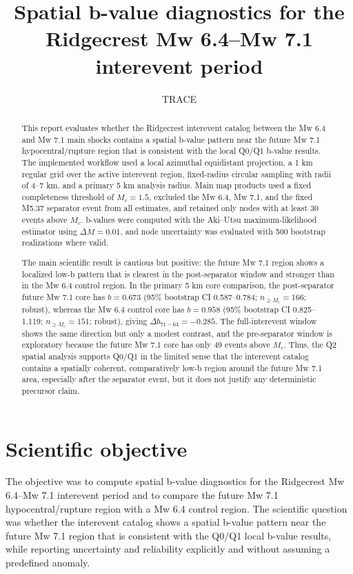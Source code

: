 \documentclass[11pt]{article}
\title{Spatial b-value diagnostics for the Ridgecrest Mw 6.4--Mw 7.1 interevent period}
\author{TRACE}
\date{}
\begin{document}
\maketitle

\begin{abstract}
This report evaluates whether the Ridgecrest interevent catalog between the Mw 6.4 and Mw 7.1 main shocks contains a spatial b-value pattern near the future Mw 7.1 hypocentral/rupture region that is consistent with the local Q0/Q1 b-value results. The implemented workflow used a local azimuthal equidistant projection, a 1 km regular grid over the active interevent region, fixed-radius circular sampling with radii of 4--7 km, and a primary 5 km analysis radius. Main map products used a fixed completeness threshold of $M_c=1.5$, excluded the Mw 6.4, Mw 7.1, and the fixed M5.37 separator event from all estimates, and retained only nodes with at least 30 events above $M_c$. b-values were computed with the Aki--Utsu maximum-likelihood estimator using $\Delta M=0.01$, and node uncertainty was evaluated with 500 bootstrap realizations where valid.

The main scientific result is cautious but positive: the future Mw 7.1 region shows a localized low-b pattern that is clearest in the post-separator window and stronger than in the Mw 6.4 control region. In the primary 5 km core comparison, the post-separator future Mw 7.1 core has $b=0.673$ (95\% bootstrap CI 0.587--0.784; $n_{\ge M_c}=166$; robust), whereas the Mw 6.4 control core has $b=0.958$ (95\% bootstrap CI 0.825--1.119; $n_{\ge M_c}=151$; robust), giving $\Delta b_{71-64}=-0.285$. The full-interevent window shows the same direction but only a modest contrast, and the pre-separator window is exploratory because the future Mw 7.1 core has only 49 events above $M_c$. Thus, the Q2 spatial analysis supports Q0/Q1 in the limited sense that the interevent catalog contains a spatially coherent, comparatively low-b region around the future Mw 7.1 area, especially after the separator event, but it does not justify any deterministic precursor claim.
\end{abstract}

\section{Scientific objective}
The objective was to compute spatial b-value diagnostics for the Ridgecrest Mw 6.4--Mw 7.1 interevent period and to compare the future Mw 7.1 hypocentral/rupture region with a Mw 6.4 control region. The scientific question was whether the interevent catalog shows a spatial b-value pattern near the future Mw 7.1 region that is consistent with the Q0/Q1 local b-value results, while reporting uncertainty and reliability explicitly and without assuming a predefined anomaly.
\end{document}
